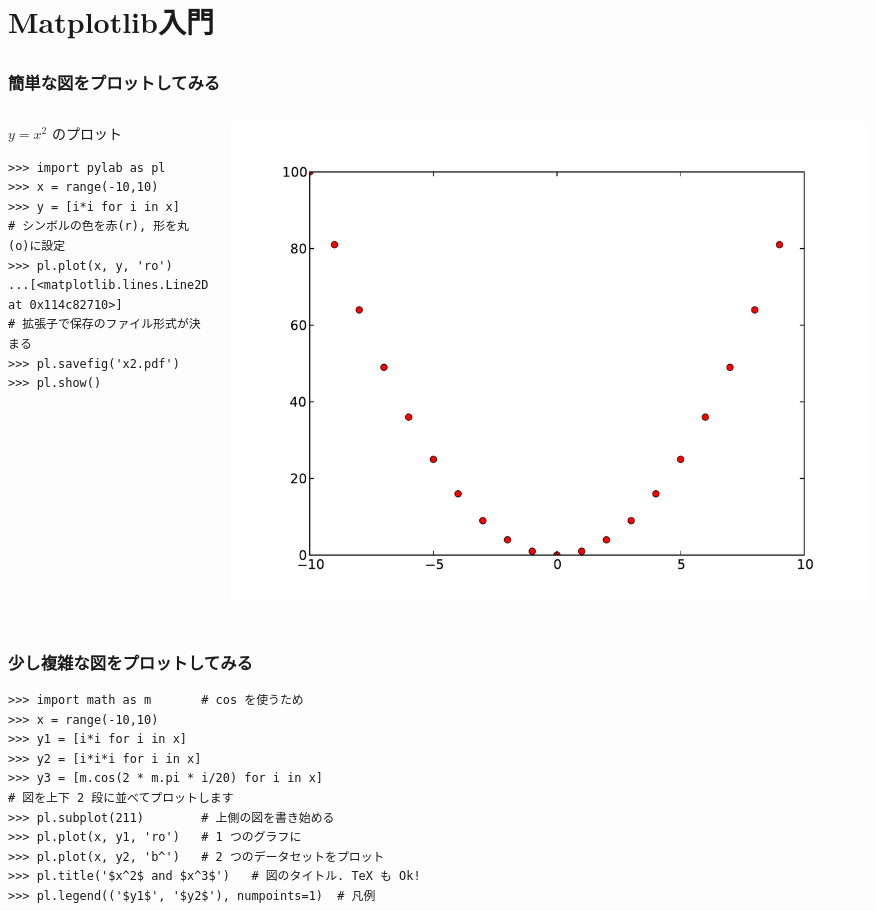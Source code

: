 \section{Matplotlib入門}

\subsection*{\redm\whiteb\greenb}
\begin{frame}[t,fragile]
\frametitle{簡単な図をプロットしてみる}
\begin{columns}
\begin{column}{6cm}
$y = x^2$ のプロット
\begin{lstlisting}
>>> import pylab as pl
>>> x = range(-10,10)
>>> y = [i*i for i in x]
# シンボルの色を赤(r), 形を丸(o)に設定
>>> pl.plot(x, y, 'ro')
...[<matplotlib.lines.Line2D at 0x114c82710>]
# 拡張子で保存のファイル形式が決まる
>>> pl.savefig('x2.pdf') 
>>> pl.show()
\end{lstlisting}
\end{column}

\begin{column}{6cm}
\includegraphics[width=\textwidth]{x2.pdf}
\end{column}
\end{columns}
\end{frame}

\subsection*{\redm\whitem\greenb}
\begin{frame}[t,fragile]
\frametitle{少し複雑な図をプロットしてみる}
\begin{lstlisting}
>>> import math as m       # cos を使うため
>>> x = range(-10,10)
>>> y1 = [i*i for i in x]
>>> y2 = [i*i*i for i in x]
>>> y3 = [m.cos(2 * m.pi * i/20) for i in x]
# 図を上下 2 段に並べてプロットします
>>> pl.subplot(211)        # 上側の図を書き始める
>>> pl.plot(x, y1, 'ro')   # 1 つのグラフに
>>> pl.plot(x, y2, 'b^')   # 2 つのデータセットをプロット
>>> pl.title('$x^2$ and $x^3$')   # 図のタイトル. TeX も Ok!
>>> pl.legend(('$y1$', '$y2$'), numpoints=1)  # 凡例
\end{lstlisting}
\end{frame}

